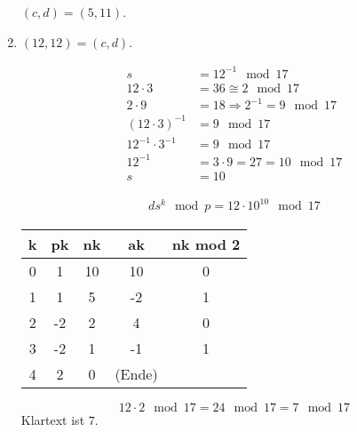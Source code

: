 \begin{enumerate}[label=\alph*)]
$(c, d) = (5, 11)$.
\item $(12,12) = (c,d)$.

\begin{align*}
s &= 12^{-1} \mod 17 \\
12\cdot 3 &= 36 \cong 2 \mod 17 \\
2\cdot 9 &= 18 \Rightarrow 2^{-1} = 9 \mod 17 \\
(12\cdot3)^{-1} &= 9 \mod 17 \\
12^{-1} \cdot 3^{-1} &= 9 \mod 17 \\
12^{-1} &= 3 \cdot 9 = 27 = 10 \mod 17 \\
s &= 10
\end{align*}

\begin{align*}
ds^{k} \mod p = 12 \cdot 10^{10} \mod 17
\end{align*}

\begin{tabular}{c|c|c|c|c}
k & pk & nk & ak & nk mod 2 \\
\hline
0 & 1 & 10 & 10 & 0 \\
1 & 1 & 5 & -2 & 1 \\
2 & -2 & 2 & 4 & 0 \\
3 & -2 & 1 & -1 & 1 \\
4 & 2 & 0 & (Ende)
\end{tabular}

\[
12\cdot 2 \mod 17 = 24 \mod 17 = 7 \mod 17
\]
Klartext ist $7$.

\end{enumerate}


























